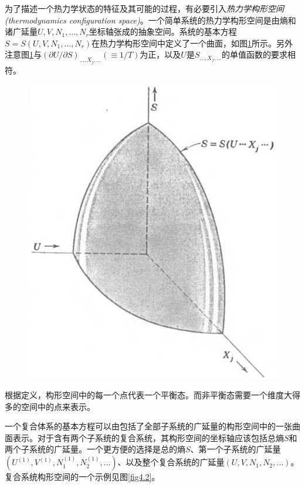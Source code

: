 为了描述一个热力学状态的特征及其可能的过程，有必要引入{\it 热力学构形空间(thermodynamics configuration space)}。一个简单系统的热力学构形空间是由熵和诸广延量$U, V, N_1,\dots ,N_r$坐标轴张成的抽象空间。系统的基本方程$S=S(U, V, N_1,\dots ,N_r)$在热力学构形空间中定义了一个曲面，如图\ref{fig4.1}所示。另外注意图\ref{fig4.1}与$(\partial U/\partial S)_{\dots , X_j,\dots}(\equiv 1/T)$为正，以及$U$是$S_{\dots , X_j,\dots}$的单值函数的要求相符。
\begin{figure}
\includegraphics[width=.7\textwidth]{Pictures/fig4.1.png}
\label{fig4.1}
\end{figure}

根据定义，构形空间中的每一个点代表一个平衡态。而非平衡态需要一个维度大得多的空间中的点来表示。

一个复合体系的基本方程可以由包括了全部子系统的广延量的构形空间中的一张曲面表示。对于含有两个子系统的复合系统，其构形空间的坐标轴应该包括总熵$S$和两个子系统的广延量。一个更方便的选择是总的熵$S$、第一个子系统的广延量$(U^{(1)},V^{(1)},N^{(1)}_1,N^{(1)}_2,\dots)$、以及整个复合系统的广延量$(U,V,N_1,N_2,\dots)$。复合系统构形空间的一个示例见图\ref{fig4.2}。

